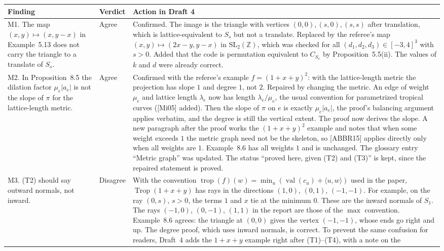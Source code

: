 \documentclass[12pt,letterpaper]{article}
\newcommand{\Z}{\mathbb{Z}}
\begin{document}
\begin{longtable}{@{}L{0.22\textwidth}L{0.12\textwidth}L{0.58\textwidth}@{}}
\toprule
Finding & Verdict & Action in Draft 4\\ \midrule
\endhead
M1. The map $(x,y)\mapsto(x,y-x)$ in Example~5.13 does not carry the
triangle to a translate of $S_s$. & Agree & Confirmed. The image is the
triangle with vertices $(0,0),(s,0),(s,s)$ after translation, which is
lattice-equivalent to $S_s$ but not a translate. Replaced by the referee's
map $(x,y)\mapsto(2x-y,y-x)$ in $\mathrm{SL}_2(\Z)$, which was checked for all
$(d_1,d_2,d_3)\in[-3,4]^3$ with $s>0$. Added that the code is permutation
equivalent to $C_{S_s}$ by Proposition~5.5(ii). The values of $k$ and $d$ were
already correct.\\
M2. In Proposition~8.5 the dilation factor $\mu_e|a_e|$ is not the slope of
$\pi$ for the lattice-length metric. & Agree & Confirmed with the referee's
example $f=(1+x+y)^2$: with the lattice-length metric the projection has
slope $1$ and degree $1$, not $2$. Repaired by changing the metric. An edge of
weight $\mu_e$ and lattice length $\lambda_e$ now has length
$\lambda_e/\mu_e$, the usual convention for parametrized tropical curves
([Mi05] added). Then the slope of $\pi$ on $e$ is exactly $\mu_e|a_e|$, the
proof's balancing argument applies verbatim, and the degree is still the
vertical extent. The proof now derives the slope. A new paragraph after the
proof works the $(1+x+y)^2$ example and notes that when some weight exceeds
$1$ the metric graph need not be the skeleton, so [ABBR15] applies directly
only when all weights are $1$. Example~8.6 has all weights $1$ and is
unchanged. The glossary entry ``Metric graph'' was updated. The status
``proved here, given (T2) and (T3)'' is kept, since the repaired statement is
proved.\\
M3. (T2) should say outward normals, not inward. & Disagree & With the
convention $\operatorname{trop}(f)(w)=\min_u(\operatorname{val}(c_u)+\langle
u,w\rangle)$ used in the paper, $\operatorname{Trop}(1+x+y)$ has rays in the
directions $(1,0)$, $(0,1)$, $(-1,-1)$. For example, on the ray $(0,s)$,
$s>0$, the terms $1$ and $x$ tie at the minimum $0$. These are the inward
normals of $S_1$. The rays $(-1,0)$, $(0,-1)$, $(1,1)$ in the report are those
of the $\max$ convention. Example~8.6 agrees: the triangle at $(0,0)$ gives
the vertex $(-1,-1)$, whose ends go right and up. The degree proof, which
uses inward normals, is correct. To prevent the same confusion for readers,
Draft~4 adds the $1+x+y$ example right after (T1)--(T4), with a note on the

\end{longtable}
\end{document}
